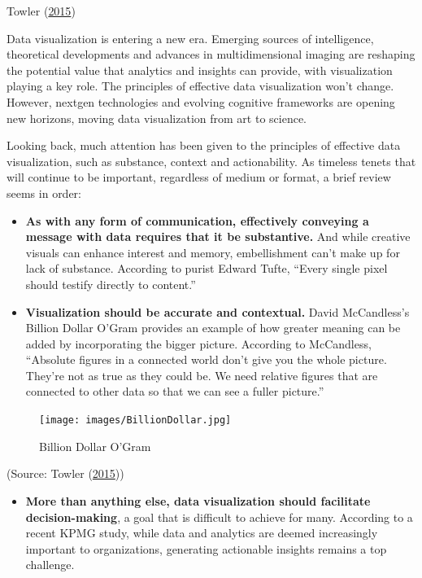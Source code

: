 \documentclass[]{book}
\providecommand{\tightlist}{%
  \setlength{\itemsep}{0pt}\setlength{\parskip}{0pt}}
\begin{document}
Towler (\protect\hyperlink{ref-future_viz}{2015})

Data visualization is entering a new era. Emerging sources of intelligence, theoretical developments and advances in multidimensional imaging are reshaping the potential value that analytics and insights can provide, with visualization playing a key role. The principles of effective data visualization won't change. However, nextgen technologies and evolving cognitive frameworks are opening new horizons, moving data visualization from art to science.

Looking back, much attention has been given to the principles of effective data visualization, such as substance, context and actionability. As timeless tenets that will continue to be important, regardless of medium or format, a brief review seems in order:

\begin{itemize}
\item
  \textbf{As with any form of communication, effectively conveying a message with data requires that it be substantive.} And while creative visuals can enhance interest and memory, embellishment can't make up for lack of substance. According to purist Edward Tufte, ``Every single pixel should testify directly to content.''
\item
  \textbf{Visualization should be accurate and contextual.} David McCandless's Billion Dollar O'Gram provides an example of how greater meaning can be added by incorporating the bigger picture. According to McCandless, ``Absolute figures in a connected world don't give you the whole picture. They're not as true as they could be. We need relative figures that are connected to other data so that we can see a fuller picture.''
\end{itemize}

\begin{figure}
\centering
\texttt{[image: images/BillionDollar.jpg]}
\caption{Billion Dollar O'Gram}
\end{figure}

(Source: Towler (\protect\hyperlink{ref-future_viz}{2015}))

\begin{itemize}
\tightlist
\item
  \textbf{More than anything else, data visualization should facilitate decision-making}, a goal that is difficult to achieve for many. According to a recent KPMG study, while data and analytics are deemed increasingly important to organizations, generating actionable insights remains a top challenge.
\end{itemize}
\end{document}
